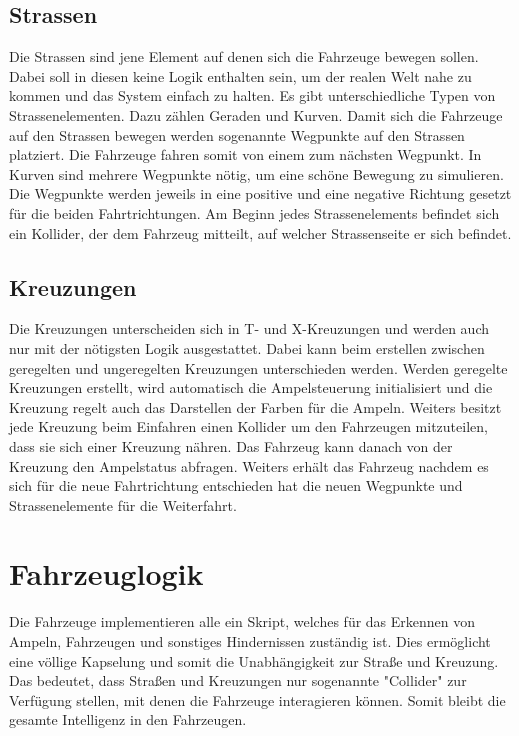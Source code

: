 \subsection{Strassen}

Die Strassen sind jene Element auf denen sich die Fahrzeuge bewegen sollen. Dabei soll in diesen keine Logik enthalten sein, um der realen Welt nahe zu kommen und das System einfach zu halten. Es gibt unterschiedliche Typen von Strassenelementen. Dazu zählen Geraden und Kurven. Damit sich die Fahrzeuge auf den Strassen bewegen werden sogenannte Wegpunkte auf den Strassen platziert. Die Fahrzeuge fahren somit von einem zum nächsten Wegpunkt. In Kurven sind mehrere Wegpunkte nötig, um eine schöne Bewegung zu simulieren. Die Wegpunkte werden jeweils in eine positive und eine negative Richtung gesetzt für die beiden Fahrtrichtungen. Am Beginn jedes Strassenelements befindet sich ein Kollider, der dem Fahrzeug mitteilt, auf welcher Strassenseite er sich befindet.

\subsection{Kreuzungen}

Die Kreuzungen unterscheiden sich in T- und X-Kreuzungen und werden auch nur mit der nötigsten Logik ausgestattet. Dabei kann beim erstellen zwischen geregelten und ungeregelten Kreuzungen unterschieden werden. Werden geregelte Kreuzungen erstellt, wird automatisch die Ampelsteuerung initialisiert und die Kreuzung regelt auch das Darstellen der Farben für die Ampeln. Weiters besitzt jede Kreuzung beim Einfahren einen Kollider um den Fahrzeugen mitzuteilen, dass sie sich einer Kreuzung nähren. Das Fahrzeug kann danach von der Kreuzung den Ampelstatus abfragen. Weiters erhält das Fahrzeug nachdem es sich für die neue Fahrtrichtung entschieden hat die neuen Wegpunkte und Strassenelemente für die Weiterfahrt.


\section{Fahrzeuglogik}
\label{Fahrzeuglogik}

Die Fahrzeuge implementieren alle ein Skript, welches für das Erkennen von Ampeln, Fahrzeugen und sonstiges Hindernissen zuständig ist. Dies ermöglicht eine völlige Kapselung und somit die Unabhängigkeit zur Straße und Kreuzung. Das bedeutet, dass Straßen und Kreuzungen nur sogenannte "Collider" zur Verfügung stellen, mit denen die Fahrzeuge interagieren können. Somit bleibt die gesamte Intelligenz in den Fahrzeugen.



